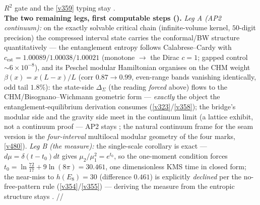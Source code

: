 \begin{keybox}
$R^2$ gate and the \vref{v359} typing stay \mO.
\smallskip\\
\noindent\textbf{The two remaining legs, first computable steps ().}
\emph{Leg A (AP2 continuum):} on the exactly solvable critical chain (infinite-volume kernel, $50$-digit
precision) the compressed interval state carries the conformal/BW structure quantitatively --- the
entanglement entropy follows Calabrese--Cardy with $c_{\mathrm{est}}=1.00089/1.00038/1.00021$ (monotone
$\to$ the Dirac $c{=}1$; gapped control $\sim6{\times}10^{-8}$), and its Peschel modular Hamiltonian
organises on the CHM weight $\beta(x){=}x(L{-}x)/L$ (corr $0.87{\to}0.99$, even-range bands vanishing
identically, odd tail $1.8\%$): the state-side $\Delta_\Sigma$ (the reading \emph{forced} above) flows
to the CHM/Bisognano--Wichmann geometric form --- \emph{exactly} the object the entanglement-equilibrium
derivation consumes (\vref{v323}/\vref{v358}); the bridge's modular side and the gravity side meet in
the continuum limit (a lattice exhibit, not a continuum proof --- AP2 stays \mO; the natural continuum
frame for the seam version is the \emph{four-interval} multilocal modular geometry of the four marks,
\vref{v480}). \emph{Leg B (the
measure):} the single-scale corollary is exact --- $d\mu{=}\delta(t{-}t_0)dt$ gives
$\mu_2/\mu_1^2{=}e^{t_0}$, so the one-moment condition forces $t_0{=}\ln\tfrac{72}{17}{+}9\ln(8\pi)
{=}30.461$, one dimensionless KMS time in closed form; the near-miss to $h(E_8){=}30$ (difference
$0.461$) is explicitly \emph{declined} per the no-free-pattern rule (\vref{v354}/\vref{v355}) ---
deriving the measure from the entropic structure stays \mO.
\mE/\mC/\mO
\end{keybox}


